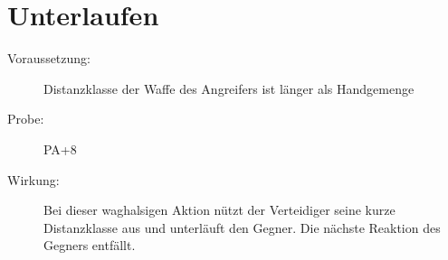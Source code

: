 \section{Unterlaufen}
\label{uPA.unterlaufen}
\begin{description}
    \item[Voraussetzung:]
        Distanzklasse der Waffe des Angreifers ist länger als Handgemenge
    \item[Probe:]
        PA+8
    \item[Wirkung:]
        Bei dieser waghalsigen Aktion nützt der Verteidiger seine kurze Distanzklasse aus und unterläuft den Gegner.
        Die nächste Reaktion des Gegners entfällt.
\end{description}
